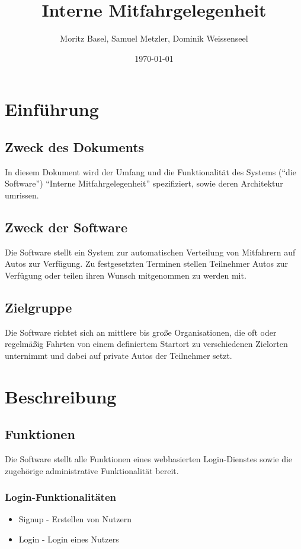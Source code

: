 \documentclass[11pt,a4paper]{article}
\author{Moritz Basel, Samuel Metzler, Dominik Weissenseel}
\title{Interne Mitfahrgelegenheit}
\date{\today{}}
\begin{document}
\normalfont


\maketitle{}
\tableofcontents{}

\section{Einführung}
\subsection{Zweck des Dokuments}
In diesem Dokument wird der Umfang und die Funktionalität des Systems (``die Software'') ``Interne Mitfahrgelegenheit'' spezifiziert, sowie deren Architektur umrissen.
\subsection{Zweck der Software}
Die Software stellt ein System zur automatischen Verteilung von Mitfahrern auf Autos zur Verfügung. Zu festgesetzten Terminen stellen Teilnehmer Autos zur Verfügung oder teilen ihren Wunsch mitgenommen zu werden mit.
\subsection{Zielgruppe}
Die Software richtet sich an mittlere bis große Organisationen, die oft oder regelmäßig Fahrten von einem definiertem Startort zu verschiedenen Zielorten unternimmt und dabei auf private Autos der Teilnehmer setzt.

\section{Beschreibung}
\subsection{Funktionen}
Die Software stellt alle Funktionen eines webbasierten Login-Dienstes sowie die zugehörige administrative Funktionalität  bereit.
\subsubsection{Login-Funktionalitäten}
\begin{itemize}
\item Signup - Erstellen von Nutzern
\item Login - Login eines Nutzers
\end{itemize}
\end{document}
